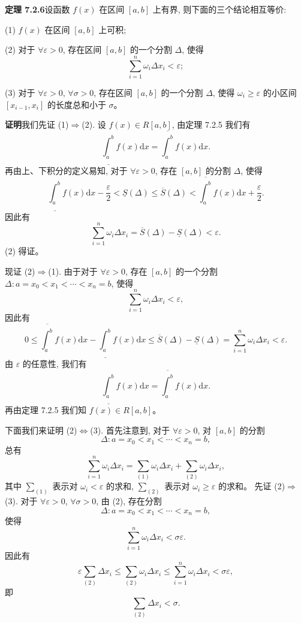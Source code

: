 \documentclass[UTF8,12pt,a4paper,fontset=fandol]{ctexart}
\begin{document}
\noindent\textbf{定理 7.2.6}\quad 设函数 $f(x)$ 在区间 $[a,b]$ 上有界, 则下面的三个结论相互等价:

(1) $f(x)$ 在区间 $[a,b]$ 上可积;

(2) 对于 $\forall\varepsilon>0$, 存在区间 $[a,b]$ 的一个分割 $\Delta$, 使得
\[
  \sum_{i=1}^n \omega_i\Delta x_i<\varepsilon;
\]

(3) 对于 $\forall\varepsilon>0$, $\forall\sigma>0$, 存在区间 $[a,b]$ 的一个分割 $\Delta$, 使得 $\omega_i\geq\varepsilon$ 的小区间 $[x_{i-1},x_i]$ 的长度总和小于 $\sigma$。

\noindent\textbf{证明}\quad 我们先证 (1)$\Rightarrow$(2). 设 $f(x)\in R[a,b]$, 由定理 7.2.5 我们有
\[
  \underline{\int_a^b} f(x)\mathrm dx=\overline{\int_a^b} f(x)\mathrm dx.
\]
再由上、下积分的定义易知, 对于 $\forall\varepsilon>0$, 存在 $[a,b]$ 的分割 $\Delta$, 使得
\[
  \underline{\int_a^b} f(x)\mathrm dx-\frac{\varepsilon}{2}<\underline S(\Delta)\leq \overline S(\Delta)<\overline{\int_a^b} f(x)\mathrm dx+\frac{\varepsilon}{2}.
\]
因此有
\[
  \sum_{i=1}^n \omega_i\Delta x_i=\overline S(\Delta)-\underline S(\Delta)<\varepsilon.
\]
(2) 得证。

现证 (2)$\Rightarrow$(1). 由于对于 $\forall\varepsilon>0$, 存在 $[a,b]$ 的一个分割 $\Delta:a=x_0<x_1<\cdots<x_n=b$, 使得
\[
  \sum_{i=1}^n \omega_i\Delta x_i<\varepsilon,
\]
因此有
\[
  0\leq \overline{\int_a^b} f(x)\mathrm dx-\underline{\int_a^b} f(x)\mathrm dx
  \leq \overline S(\Delta)-\underline S(\Delta)
  =\sum_{i=1}^n\omega_i\Delta x_i<\varepsilon.
\]
由 $\varepsilon$ 的任意性, 我们有
\[
  \underline{\int_a^b} f(x)\mathrm dx=\overline{\int_a^b} f(x)\mathrm dx.
\]
再由定理 7.2.5 我们知 $f(x)\in R[a,b]$。

下面我们来证明 (2)$\Longleftrightarrow$(3). 首先注意到, 对于 $\forall\varepsilon>0$, 对 $[a,b]$ 的分割
\[
  \Delta:a=x_0<x_1<\cdots<x_n=b,
\]
总有
\[
  \sum_{i=1}^n\omega_i\Delta x_i=\sum_{(1)}\omega_i\Delta x_i+\sum_{(2)}\omega_i\Delta x_i,
\]
其中 $\sum_{(1)}$ 表示对 $\omega_i<\varepsilon$ 的求和, $\sum_{(2)}$ 表示对 $\omega_i\geq\varepsilon$ 的求和。
先证 (2)$\Rightarrow$(3). 对于 $\forall\varepsilon>0$, $\forall\sigma>0$, 由 (2), 存在分割
\[
  \Delta:a=x_0<x_1<\cdots<x_n=b,
\]
使得
\[
  \sum_{i=1}^n\omega_i\Delta x_i<\sigma\varepsilon.
\]
因此有
\[
  \varepsilon\sum_{(2)}\Delta x_i\leq \sum_{(2)}\omega_i\Delta x_i\leq \sum_{i=1}^n\omega_i\Delta x_i<\sigma\varepsilon,
\]
即
\[
  \sum_{(2)}\Delta x_i<\sigma.
\]
\end{document}
